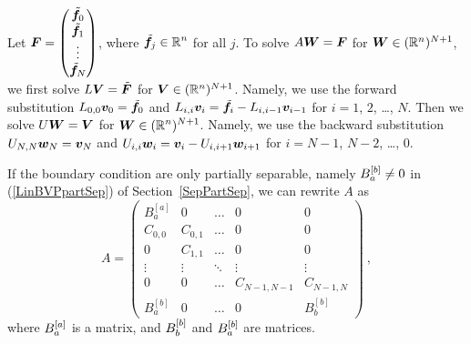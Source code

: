 Let $\displaystyle \bm{F} = \begin{pmatrix}
\tilde{\bm{f}}_0 \\ \tilde{\bm{f}}_1 \\ \vdots \\
\tilde{\bm{f}}_N \end{pmatrix}$,
where $\displaystyle \tilde{\bm{f}}_j \in \mathbb{R}^n$ for all $j$.
To solve
$\displaystyle A \bm{W} = \bm{F}$ for $\bm{W} \in (\mathbb{R}^n)^{N+1}$,
we first solve
$\displaystyle L\bm{V} = \tilde{\bm{F}}$ for $\bm{V} \in (\mathbb{R}^n)^{N+1}$.
Namely, we use the forward substitution
$L_{0,0}\bm{v}_0 = \tilde{\bm{f}}_0$ and
$L_{i,i}\bm{v}_i = \tilde{\bm{f}}_i - L_{i,i-1} \bm{v}_{i-1}$ for $i=1$, $2$,
\ldots, $N$.
Then we solve $U \bm{W} = \bm{V}$ for
$\displaystyle \bm{W} \in (\mathbb{R}^n)^{N+1}$.
Namely, we use the backward substitution $U_{N,N} \bm{w}_N = \bm{v}_N$ and
$U_{i,i} \bm{w}_i = \bm{v}_i - U_{i,i+1} \bm{w}_{i+1}$ for $i=N-1$,
$N-2$, \ldots, $0$.

If the boundary condition are only partially separable, namely
$\displaystyle B_a^{[b]} \neq 0$ in (\ref{LinBVPpartSep}) of
Section~\ref{SepPartSep}, we can rewrite $A$ as
\begin{equation} \label{part_sepM}
A = \begin{pmatrix}
B_a^{[a]} & 0 & \ldots & 0 & 0 \\
C_{0,0} & C_{0,1} & \ldots & 0 & 0 \\
0 & C_{1,1} & \ldots & 0 & 0 \\
\vdots & \vdots & \ddots & \vdots & \vdots \\
0 & 0 & \ldots & C_{N-1,N-1} & C_{N-1,N} \\
B_a^{[b]} & 0 & \ldots & 0 & B_b^{[b]}
\end{pmatrix} \ ,
\end{equation}
where $\displaystyle B_a^{[a]}$ is a  matrix, and
$\displaystyle B_b^{[b]}$ and $\displaystyle B_a^{[b]}$ are  matrices.

